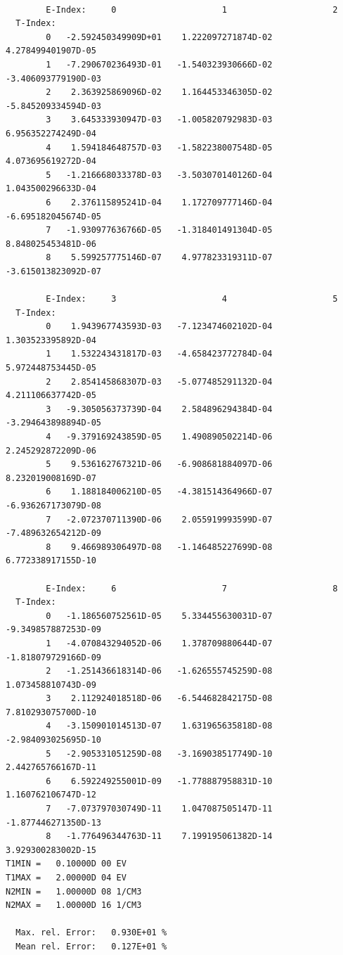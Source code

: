 \documentclass[amsmath,amssymb,a4]{revtex4-2}
\begin{document}
\begin{small}\begin{verbatim}

        E-Index:     0                     1                     2
  T-Index:
        0   -2.592450349909D+01    1.222097271874D-02    4.278499401907D-05
        1   -7.290670236493D-01   -1.540323930666D-02   -3.406093779190D-03
        2    2.363925869096D-02    1.164453346305D-02   -5.845209334594D-03
        3    3.645333930947D-03   -1.005820792983D-03    6.956352274249D-04
        4    1.594184648757D-03   -1.582238007548D-05    4.073695619272D-04
        5   -1.216668033378D-03   -3.503070140126D-04    1.043500296633D-04
        6    2.376115895241D-04    1.172709777146D-04   -6.695182045674D-05
        7   -1.930977636766D-05   -1.318401491304D-05    8.848025453481D-06
        8    5.599257775146D-07    4.977823319311D-07   -3.615013823092D-07

        E-Index:     3                     4                     5
  T-Index:
        0    1.943967743593D-03   -7.123474602102D-04    1.303523395892D-04
        1    1.532243431817D-03   -4.658423772784D-04    5.972448753445D-05
        2    2.854145868307D-03   -5.077485291132D-04    4.211106637742D-05
        3   -9.305056373739D-04    2.584896294384D-04   -3.294643898894D-05
        4   -9.379169243859D-05    1.490890502214D-06    2.245292872209D-06
        5    9.536162767321D-06   -6.908681884097D-06    8.232019008169D-07
        6    1.188184006210D-05   -4.381514364966D-07   -6.936267173079D-08
        7   -2.072370711390D-06    2.055919993599D-07   -7.489632654212D-09
        8    9.466989306497D-08   -1.146485227699D-08    6.772338917155D-10

        E-Index:     6                     7                     8
  T-Index:
        0   -1.186560752561D-05    5.334455630031D-07   -9.349857887253D-09
        1   -4.070843294052D-06    1.378709880644D-07   -1.818079729166D-09
        2   -1.251436618314D-06   -1.626555745259D-08    1.073458810743D-09
        3    2.112924018518D-06   -6.544682842175D-08    7.810293075700D-10
        4   -3.150901014513D-07    1.631965635818D-08   -2.984093025695D-10
        5   -2.905331051259D-08   -3.169038517749D-10    2.442765766167D-11
        6    6.592249255001D-09   -1.778887958831D-10    1.160762106747D-12
        7   -7.073797030749D-11    1.047087505147D-11   -1.877446271350D-13
        8   -1.776496344763D-11    7.199195061382D-14    3.929300283002D-15
T1MIN =   0.10000D 00 EV
T1MAX =   2.00000D 04 EV
N2MIN =   1.00000D 08 1/CM3
N2MAX =   1.00000D 16 1/CM3

  Max. rel. Error:   0.930E+01 %
  Mean rel. Error:   0.127E+01 %
\end{verbatim}\end{small}
\end{document}
